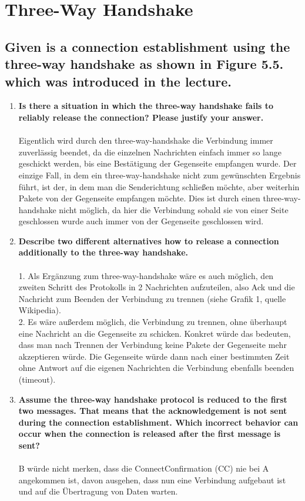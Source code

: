 \documentclass[a4paper,
			llpt,
			solution,
			accentcolor=tud2d,
			colorbacktitle
			]
			{tudexercise}
\begin{document}
\section{Three-Way Handshake}
\subsection{Given is a connection establishment using the three-way handshake as shown in Figure 5.5. which was introduced in the lecture.}
\begin{enumerate}
\item \textbf{Is there a situation in which the three-way handshake fails to reliably release the connection?
Please justify your answer.}\\
\\
Eigentlich wird durch den three-way-handshake die Verbindung immer zuverlässig beendet, da die einzelnen Nachrichten einfach immer so lange geschickt werden, bis eine Bestätigung der Gegenseite empfangen wurde.
Der einzige Fall, in dem ein three-way-handshake nicht zum gewünschten Ergebnis führt, ist der, in dem man die Senderichtung schließen möchte, aber weiterhin Pakete von der Gegenseite empfangen möchte. Dies ist durch einen three-way-handshake nicht möglich, da hier die Verbindung sobald sie von einer Seite geschlossen wurde auch immer von der Gegenseite geschlossen wird.
\item \textbf{Describe two different alternatives how to release a connection additionally to the three-way
handshake.}\\
\\
1. Als Ergänzung zum three-way-handshake wäre es auch möglich, den zweiten Schritt des Protokolls in 2 Nachrichten aufzuteilen, also Ack und die Nachricht zum Beenden der Verbindung zu trennen (siehe Grafik 1, quelle Wikipedia).\\
2. Es wäre außerdem möglich, die Verbindung zu trennen, ohne überhaupt eine Nachricht an die Gegenseite zu schicken. Konkret würde das bedeuten, dass man nach Trennen der Verbindung keine Pakete der Gegenseite mehr akzeptieren würde. Die Gegenseite würde dann nach einer bestimmten Zeit ohne Antwort auf die eigenen Nachrichten die Verbindung ebenfalls beenden (timeout).
\item \textbf{Assume the three-way handshake protocol is reduced to the first two messages. That means
that the acknowledgement is not sent during the connection establishment. Which incorrect
behavior can occur when the connection is released after the first message is sent?}\\
\\
B würde nicht merken, dass die ConnectConfirmation (CC) nie bei A angekommen ist, davon ausgehen, dass nun eine Verbindung aufgebaut ist und auf die Übertragung von Daten warten.
\end{enumerate}
\end{document}

